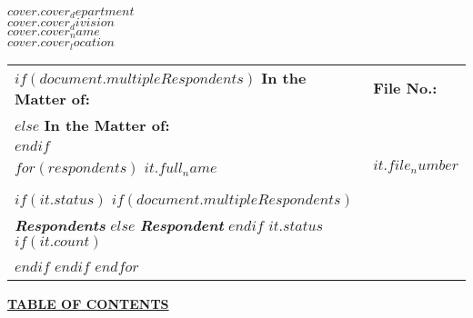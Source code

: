\documentclass[12pt]{letter}
\begin{document}
\begin{letter}{}

\begin{center}
    \textbf{$cover.cover_department$} \\
    \textbf{$cover.cover_division$} \\
    \textbf{$cover.cover_name$} \\
    \textbf{$cover.cover_location$}
\end{center}

\renewcommand{\arraystretch}{1.2}  %

\vspace{2em}
\makebox[0.5\textwidth]{\hrulefill}
\begin{flushleft}
    \begin{tabular}{ p{} | p{} }
      $if(document.multipleRespondents)$
        \textbf{In the Matter of:} & \textbf{\hspace{1em}File No.:} \\
      $else$
        \textbf{In the Matter of:} \\
      $endif$ 
      \vspace{.0em} & \\ 
      $for(respondents)$
        \textbf{$it.full_name$} & \textbf{\hspace{1em}$it.file_number$} \\ \\
        $if(it.status)$ 
          $if(document.multipleRespondents)$
            \vspace{.0em} & \\ 
            \textit{\textbf{Respondents}}
          $else$
            \textit{\textbf{Respondent}} 
          $endif$ 
          \textbf{$it.status$}
          $if(it.count)$ 
            \vspace{.25em} & \\
          $endif$
        $endif$    
      $endfor$
    \end{tabular}
\end{flushleft}
\makebox[0.5\textwidth]{\hrulefill}
 
\vspace{1em}

\fontsize{20}{22}\selectfont %

\begin{center}
    \underline{\textbf{TABLE OF CONTENTS}}
\end{center}


\end{letter}
\end{document}
